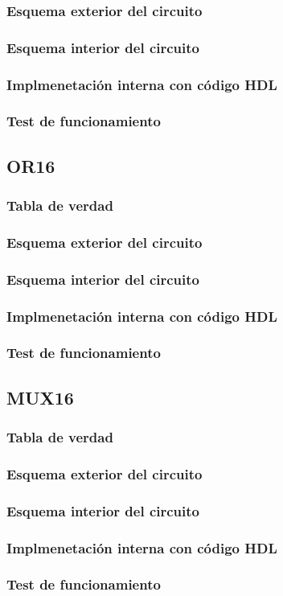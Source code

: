 \documentclass[12pt]{article}
\begin{document}
        \subsubsection{Esquema exterior del circuito}
        \subsubsection{Esquema interior del circuito}
        \subsubsection{Implmenetación interna con código HDL}
        \subsubsection{Test de funcionamiento}
    \newpage
    \subsection{OR16}
        \subsubsection{Tabla de verdad}
        \subsubsection{Esquema exterior del circuito}
        \subsubsection{Esquema interior del circuito}
        \subsubsection{Implmenetación interna con código HDL}
        \subsubsection{Test de funcionamiento}
    \newpage
    \subsection{MUX16}
        \subsubsection{Tabla de verdad}
        \subsubsection{Esquema exterior del circuito}
        \subsubsection{Esquema interior del circuito}
        \subsubsection{Implmenetación interna con código HDL}
        \subsubsection{Test de funcionamiento}
    \newpage

\printbibliography[heading=bibintoc]
\end{document}
